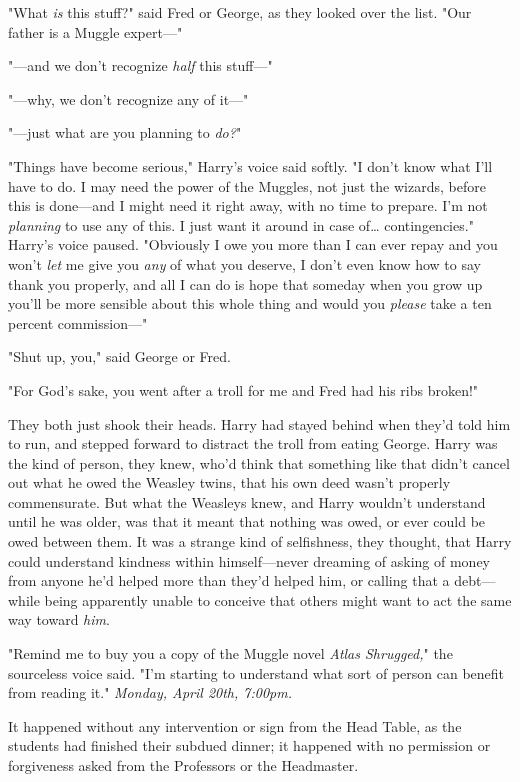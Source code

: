 "What \emph{is} this stuff?" said Fred or George, as they looked over the list. 
"Our father is a Muggle expert---"

"---and we don't recognize \emph{half} this stuff---"

"---why, we don't recognize any of it---"

"---just what are you planning to \emph{do?}"

"Things have become serious," Harry's voice said softly. "I don't know what 
I'll have to do. I may need the power of the Muggles, not just the wizards, 
before this is done---and I might need it right away, with no time to prepare. 
I'm not \emph{planning} to use any of this. I just want it around in case 
of{\ldots} contingencies." Harry's voice paused. "Obviously I owe you more than 
I can ever repay and you won't \emph{let} me give you \emph{any} of what you 
deserve, I don't even know how to say thank you properly, and all I can do is 
hope that someday when you grow up you'll be more sensible about this whole 
thing and would you \emph{please} take a ten percent commission---"

"Shut up, you," said George or Fred.

"For God's sake, you went after a troll for me and Fred had his ribs broken!"

They both just shook their heads. Harry had stayed behind when they'd told him 
to run, and stepped forward to distract the troll from eating George. Harry was 
the kind of person, they knew, who'd think that something like that didn't 
cancel out what he owed the Weasley twins, that his own deed wasn't properly 
commensurate. But what the Weasleys knew, and Harry wouldn't understand until 
he was older, was that it meant that nothing was owed, or ever could be owed 
between them. It was a strange kind of selfishness, they thought, that Harry 
could understand kindness within himself---never dreaming of asking of money 
from anyone he'd helped more than they'd helped him, or calling that a 
debt---while being apparently unable to conceive that others might want to act 
the same way toward \emph{him}.

"Remind me to buy you a copy of the Muggle novel \emph{Atlas Shrugged,}" the 
sourceless voice said. "I'm starting to understand what sort of person can 
benefit from reading it."
\sbreak
\emph{Monday, April 20th, 7:00pm.}

It happened without any intervention or sign from the Head Table, as the 
students had finished their subdued dinner; it happened with no permission or 
forgiveness asked from the Professors or the Headmaster.

